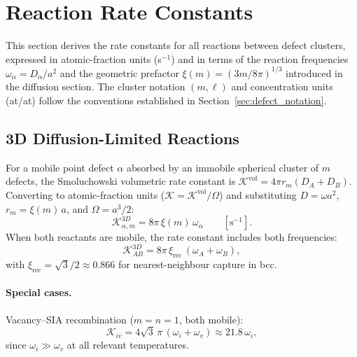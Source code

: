 \section{Reaction Rate Constants}
\label{sec:reaction_rates}

This section derives the rate constants for all reactions between defect
clusters, expressed in atomic-fraction units (s$^{-1}$) and in terms of the
reaction frequencies $\omega_\alpha = D_\alpha/a^2$ and the geometric prefactor
$\xi(m) = (3m/8\pi)^{1/3}$ introduced in the diffusion section. The cluster
notation $(m,\ell)$ and concentration units (at/at) follow the conventions
established in Section~\ref{sec:defect_notation}.

\subsection{3D Diffusion-Limited Reactions}
\label{sec:K3D}

For a mobile point defect $\alpha$ absorbed by an immobile spherical cluster
of $m$ defects, the Smoluchowski volumetric rate constant is
$\mathcal{K}^{\mathrm{vol}} = 4\pi r_m (D_A + D_B)$. Converting to
atomic-fraction units ($\mathcal{K} = \mathcal{K}^{\mathrm{vol}}/\Omega$) and
substituting $D = \omega a^2$, $r_m = \xi(m)\,a$, and $\Omega = a^3/2$:
\begin{equation}\label{eq:K3D}
    \mathcal{K}_{\alpha,m}^{3D} = 8\pi\,\xi(m)\,\omega_\alpha
    \qquad [\text{s}^{-1}].
\end{equation}
When both reactants are mobile, the rate constant includes both frequencies:
\begin{equation}\label{eq:K3D_both}
    \mathcal{K}_{AB}^{3D} = 8\pi\,\xi_{\mathrm{rec}}\,(\omega_A + \omega_B),
\end{equation}
with $\xi_{\mathrm{rec}} = \sqrt{3}/2 \approx 0.866$ for nearest-neighbour
capture in bcc.

\paragraph{Special cases.}

Vacancy--SIA recombination ($m=n=1$, both mobile):
\begin{equation}\label{eq:K_recomb}
    \mathcal{K}_{iv} = 4\sqrt{3}\,\pi\,(\omega_i + \omega_v)
    \approx 21.8\,\omega_i,
\end{equation}
since $\omega_i \gg \omega_v$ at all relevant temperatures.

